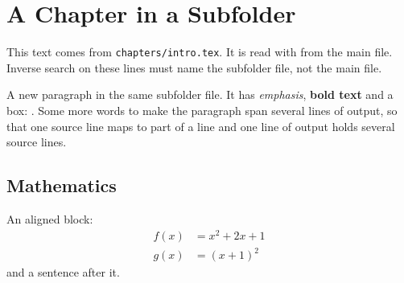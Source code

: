 \section{A Chapter in a Subfolder}\label{sec:intro}
This text comes from \texttt{chapters/intro.tex}.
It is read with \verb|| from the main file.
Inverse search on these lines must name the subfolder file, not the main file.

A new paragraph in the same subfolder file.
It has \emph{emphasis}, \textbf{bold text} and a box: .
Some more words to make the paragraph span several lines of output,
so that one source line maps to part of a line and one line of output holds several source lines.

\subsection{Mathematics}
An aligned block:
\begin{align}
  f(x) &= x^2 + 2x + 1 \\
  g(x) &= (x + 1)^2
\end{align}
and a sentence after it.
